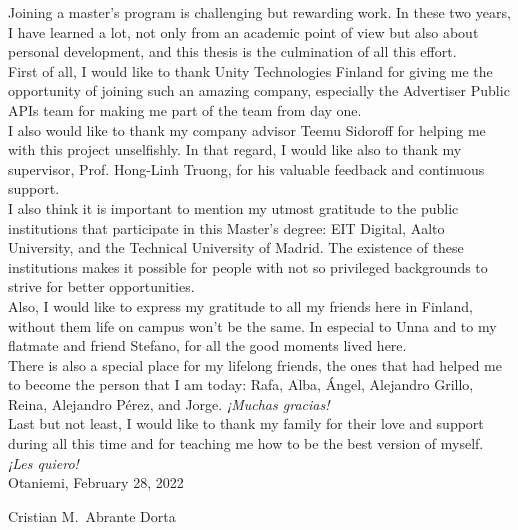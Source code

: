 Joining a master's program is challenging but rewarding work. In these two years, I have learned a lot, not only from an academic point of view but also about personal development, and this thesis is the culmination of all this effort.\\

First of all, I would like to thank Unity Technologies Finland for giving me the opportunity of joining such an amazing company, especially the Advertiser Public APIs team for making me part of the team from day one.\\

I also would like to thank my company advisor Teemu Sidoroff for helping me with this project unselfishly. In that regard, I would like also to thank my supervisor, Prof. Hong-Linh Truong, for his valuable feedback and continuous support.\\

I also think it is important to mention my utmost gratitude to the public institutions that participate in this Master's degree: EIT Digital, Aalto University, and the Technical University of Madrid. The existence of these institutions makes it possible for people with not so privileged backgrounds to strive for better opportunities.\\

Also, I would like to express my gratitude to all my friends here in Finland, without them life on campus won't be the same. In especial to Unna and to my flatmate and friend Stefano, for all the good moments lived here.\\

There is also a special place for my lifelong friends, the ones that had helped me to become the person that I am today: Rafa, Alba, Ángel, Alejandro Grillo, Reina, Alejandro Pérez, and Jorge. \textit{¡Muchas gracias!}\\

Last but not least, I would like to thank my family for their love and support during all this time and for teaching me how to be the best version of myself. \textit{¡Les quiero!}\\

\vspace{2cm}
Otaniemi, February 28, 2022

\vspace{5mm}
{\hfill Cristian M.\ Abrante Dorta \hspace{1cm}}